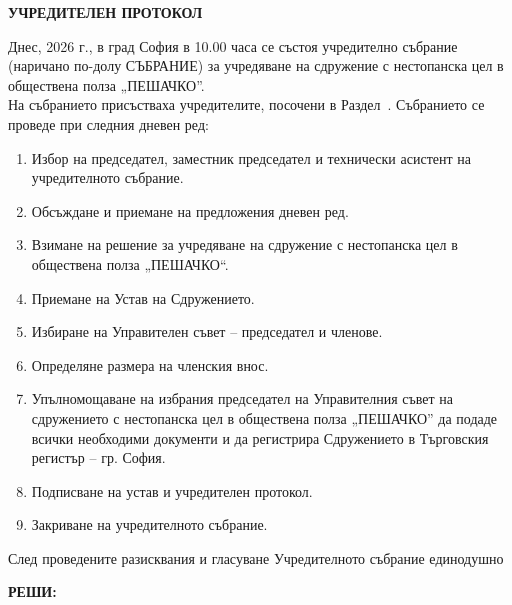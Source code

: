 \documentclass[11pt,a4paper]{article}
\begin{document}
\begin{center}
  {\bf\Huge УЧРЕДИТЕЛЕН ПРОТОКОЛ}
\end{center}

\vspace{0.7cm}

Днес, \makebox[3cm]{\dotfill} 2026 г., в град София в 10.00 часа се състоя учредително
събрание (наричано по-долу СЪБРАНИЕ) за учредяване на сдружение с нестопанска цел в
обществена полза „ПЕШАЧКО”. \\[0.2cm]

\noindent На събранието присъстваха учредителите, посочени в
Раздел~. Събранието се проведе при следния дневен ред:

\begin{enumerate}
\item Избор на председател, заместник председател и технически асистент на учредителното събрание.
\item Обсъждане и приемане на предложения дневен ред.
\item Взимане на решение за учредяване на сдружение с нестопанска цел в обществена полза
  „ПЕШАЧКО“.
\item Приемане на Устав на Сдружението.
\item Избиране на Управителен съвет -- председател и членове.
\item Определяне размера на членския внос.
\item Упълномощаване на избрания председател на Управителния съвет на сдружението с
  нестопанска цел в обществена полза „ПЕШАЧКО” да подаде всички необходими документи и
  да регистрира Сдружението в Търговския регистър -- гр. София.
\item Подписване на устав и учредителен протокол.
\item Закриване на учредителното събрание.
\end{enumerate}

След проведените разисквания и гласуване Учредителното събрание единодушно

\begin{center}
  {\bf\large РЕШИ:}
\end{center}
\end{document}
